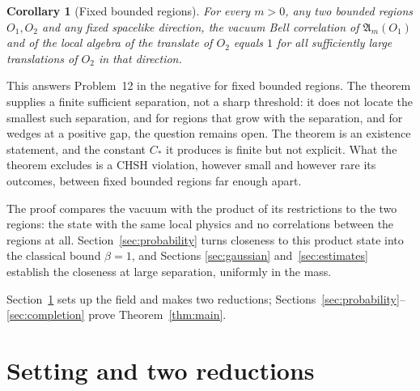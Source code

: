 \documentclass[aps,prl,reprint,longbibliography,raggedbottom]{revtex4-2}
\newtheorem{corollary}{Corollary}
\newcommand{\A}{\mathfrak A}
\begin{document}
\begin{corollary}[Fixed bounded regions]\label{cor:fixed}
For every $m>0$, any two bounded regions $O_1,O_2$ and any fixed
spacelike direction, the vacuum Bell correlation of $\A_m(O_1)$ and of
the local algebra of the translate of $O_2$ equals $1$ for all
sufficiently large translations of $O_2$ in that direction.
\end{corollary}

This answers Problem~12 in the negative for fixed bounded
regions. The theorem supplies a finite sufficient separation, not a
sharp threshold: it does not locate the smallest such separation, and
for regions that grow with the separation, and for wedges at a
positive gap, the question remains open. The theorem is an existence
statement, and the constant $C_*$
it produces is finite but not explicit. What the theorem excludes is a CHSH
violation, however small and however rare its outcomes, between fixed
bounded regions far enough apart.

The proof compares the vacuum with the product of its
restrictions to the two regions: the state with the same local physics
and no correlations between the regions at all.
Section~\ref{sec:probability} turns closeness to this product state
into the classical bound $\beta=1$, and Sections \ref{sec:gaussian}
and~\ref{sec:estimates} establish the closeness at large separation,
uniformly in the mass.

Section~\ref{sec:field} sets up the field and makes two reductions;
Sections~\ref{sec:probability}--\ref{sec:completion} prove
Theorem~\ref{thm:main}.


\section{Setting and two reductions}\label{sec:field}
\end{document}
